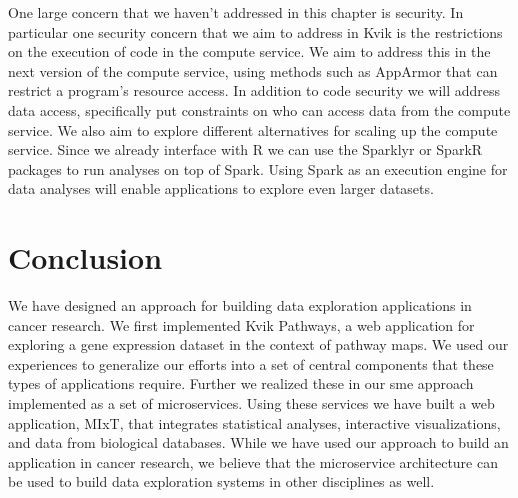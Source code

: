 One large concern that we haven't addressed in this chapter is security. In
particular one security concern that we aim to address in Kvik is the
restrictions on the execution of code in the compute service. We aim to address
this in the next version of the compute service, using methods such as
AppArmor\cite{apparmor} that can restrict a program's resource access. In
addition to code security we will address data access, specifically put
constraints on who can access data from the compute service.  We also aim to
explore different alternatives for scaling up the compute service.  Since we
already interface with R we can use the Sparklyr\cite{sparklyr} or
SparkR\cite{sparkr} packages to run analyses on top of
Spark.\cite{zaharia2012resilient} Using Spark as an execution engine for data
analyses will enable applications to explore even larger datasets.

\section{Conclusion}
We have designed an approach for building data exploration applications in
cancer research. We first implemented Kvik Pathways, a web application for
exploring a gene expression dataset in the context of pathway maps. We used our
experiences to generalize our efforts into a set of central components that
these types of applications require. Further we realized these in our \gls{sme}
approach implemented as a set of microservices.  Using these services we have
built a web application, MIxT, that integrates statistical analyses, interactive
visualizations, and data from biological databases. While we have used our
approach to build an application in cancer research, we believe that the
microservice architecture can be used to build data exploration systems in other
disciplines as well. 



